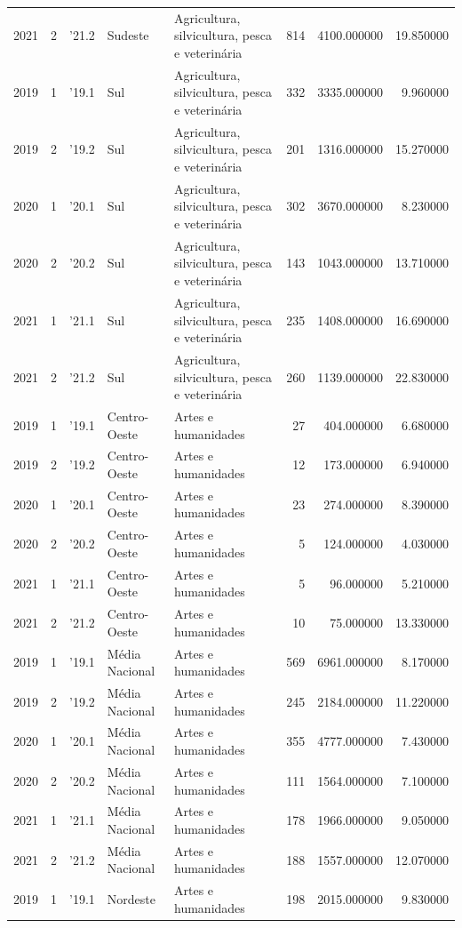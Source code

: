 \begin{longtable}{rrlllrrr}
2021 & 2 & '21.2 & Sudeste & Agricultura, silvicultura, pesca e veterinária & 814 & 4100.000000 & 19.850000 \\
2019 & 1 & '19.1 & Sul & Agricultura, silvicultura, pesca e veterinária & 332 & 3335.000000 & 9.960000 \\
2019 & 2 & '19.2 & Sul & Agricultura, silvicultura, pesca e veterinária & 201 & 1316.000000 & 15.270000 \\
2020 & 1 & '20.1 & Sul & Agricultura, silvicultura, pesca e veterinária & 302 & 3670.000000 & 8.230000 \\
2020 & 2 & '20.2 & Sul & Agricultura, silvicultura, pesca e veterinária & 143 & 1043.000000 & 13.710000 \\
2021 & 1 & '21.1 & Sul & Agricultura, silvicultura, pesca e veterinária & 235 & 1408.000000 & 16.690000 \\
2021 & 2 & '21.2 & Sul & Agricultura, silvicultura, pesca e veterinária & 260 & 1139.000000 & 22.830000 \\
2019 & 1 & '19.1 & Centro-Oeste & Artes e humanidades & 27 & 404.000000 & 6.680000 \\
2019 & 2 & '19.2 & Centro-Oeste & Artes e humanidades & 12 & 173.000000 & 6.940000 \\
2020 & 1 & '20.1 & Centro-Oeste & Artes e humanidades & 23 & 274.000000 & 8.390000 \\
2020 & 2 & '20.2 & Centro-Oeste & Artes e humanidades & 5 & 124.000000 & 4.030000 \\
2021 & 1 & '21.1 & Centro-Oeste & Artes e humanidades & 5 & 96.000000 & 5.210000 \\
2021 & 2 & '21.2 & Centro-Oeste & Artes e humanidades & 10 & 75.000000 & 13.330000 \\
2019 & 1 & '19.1 & Média Nacional & Artes e humanidades & 569 & 6961.000000 & 8.170000 \\
2019 & 2 & '19.2 & Média Nacional & Artes e humanidades & 245 & 2184.000000 & 11.220000 \\
2020 & 1 & '20.1 & Média Nacional & Artes e humanidades & 355 & 4777.000000 & 7.430000 \\
2020 & 2 & '20.2 & Média Nacional & Artes e humanidades & 111 & 1564.000000 & 7.100000 \\
2021 & 1 & '21.1 & Média Nacional & Artes e humanidades & 178 & 1966.000000 & 9.050000 \\
2021 & 2 & '21.2 & Média Nacional & Artes e humanidades & 188 & 1557.000000 & 12.070000 \\
2019 & 1 & '19.1 & Nordeste & Artes e humanidades & 198 & 2015.000000 & 9.830000 \\

\end{longtable}
